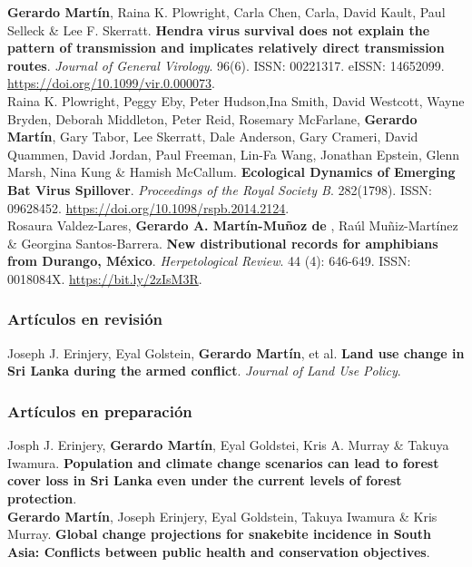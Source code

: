 \documentclass[11pt, letter]{article}
\newcommand{\years}[1]{\marginnote{\scriptsize #1}}
\begin{document}
\years{2015} \textbf{Gerardo Mart\'in}, Raina K. Plowright, Carla Chen, Carla, David Kault, Paul Selleck \& Lee F. Skerratt. \textbf{Hendra virus survival does not explain the pattern of transmission and implicates relatively direct transmission routes}. \emph{Journal of General Virology}. 96(6). ISSN: 00221317. eISSN: 14652099. \url{https://doi.org/10.1099/vir.0.000073}.\\

\years{2015} Raina K. Plowright, Peggy Eby, Peter Hudson,Ina Smith, David Westcott, Wayne Bryden, Deborah Middleton, Peter Reid, Rosemary McFarlane, \textbf{Gerardo Mart\'in}, Gary Tabor, Lee Skerratt, Dale Anderson, Gary Crameri, David Quammen, David Jordan, Paul Freeman, Lin-Fa Wang, Jonathan Epstein, Glenn Marsh, Nina Kung \& Hamish McCallum. \textbf{Ecological Dynamics of Emerging Bat Virus Spillover}. \emph{Proceedings of the Royal Society B}.  282(1798). ISSN: 09628452. \url{https://doi.org/10.1098/rspb.2014.2124}.\\

\years{2013} Rosaura Valdez-Lares, \textbf{Gerardo A. Mart\'in-Mu\~noz de }, Ra\'ul Mu\~niz-Mart\'inez \& Georgina Santos-Barrera. \textbf{New distributional records for amphibians from Durango, M\'exico}. \emph{Herpetological Review}. 44 (4): 646-649. ISSN: 0018084X. \url{https://bit.ly/2zIsM3R}.\\

\subsubsection*{Art\'iculos en revisión}

\years{2022} Joseph J. Erinjery, Eyal Golstein, \textbf{Gerardo Mart\'in}, et al. \textbf{Land use change in Sri Lanka during the armed conflict}. \emph{Journal of Land Use Policy}. \\

\subsubsection*{Art\'iculos en preparaci\'on}

\years{2022} Josph J. Erinjery, \textbf{Gerardo Mart\'in}, Eyal Goldstei, Kris A. Murray \& Takuya Iwamura. \textbf{Population and climate change scenarios can lead to forest cover loss in Sri Lanka even under the current levels of forest protection}.\\

\years{2022}  \textbf{Gerardo Mart\'in}, Joseph Erinjery, Eyal Goldstein, Takuya Iwamura \& Kris Murray. \textbf{Global change projections for snakebite incidence in South Asia: Conflicts between public health and conservation objectives}.\\
\end{document}
